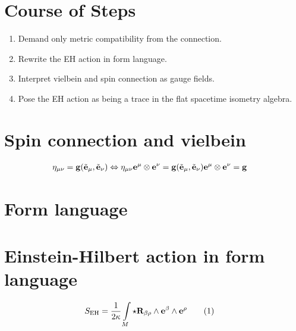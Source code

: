 \documentclass[a0,portrait]{a0poster}
\newcommand\numberthis{\addtocounter{equation}{1}\tag{\theequation}}
\begin{document}
\begin{multicols}{2}
\section*{\LARGE Course of Steps}

\begin{enumerate}\large
\item Demand only metric compatibility from the connection.
\item Rewrite the EH action in form language.
\item Interpret vielbein and spin connection as gauge fields.
\item Pose the EH action as being a trace in the flat spacetime isometry algebra.
\end{enumerate}


\section*{Spin connection and vielbein}

\begin{align}
    \eta_{\mu\nu}&=\vb g\qty(\tilde{\vb e}_\mu,\tilde{\vb e}_\nu)\Leftrightarrow \eta_{\mu\nu}\vb e^\mu\otimes\vb e^\nu=\vb g\qty(\tilde{\vb e}_\mu,\tilde{\vb e}_\nu)\vb e^\mu\otimes\vb e^\nu=\vb g
\end{align}


\section*{Form language}



\section*{Einstein-Hilbert action in form language}

\begin{align}
    S_{\textnormal{EH}}&=\frac{1}{2\kappa}\int\limits_M\star\vb R_{\beta\rho}\wedge\vb e^{\beta}\wedge\vb e^{\rho}\numberthis\label{EHAction2}
\end{align}


\end{multicols}
\end{document}
